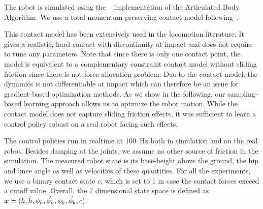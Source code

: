 The robot is simulated using the ~\cite{RBDL} implementation
of the Articulated Body Algorithm. We use a total momentum preserving contact model following~\cite[Section 3.4]{westervelt2007feedback}.



\begin{remark}
This contact model has been extensively used in the locomotion literature.
It gives a realistic, hard contact with discontinuity at impact and does not require to tune any parameters. Note that since there is only one contact point, the model is equivalent to a complementary constraint contact model without sliding friction since there is not force allocation problem. Due to the contact model, the dynamics is not
differentiable at impact which can therefore be an issue for gradient-based optimization methods. As we show in the following, our sampling-based learning approach allows us to optimize the robot motion. While the contact model does not capture sliding friction effects,
it was sufficient to learn a control policy robust on a real robot facing such effects.
\end{remark}

The control policies run in realtime at \SI{100}{\hertz} both in simulation and on the real robot. Besides damping at the joints, we assume no other source of friction in the simulation.
The measured robot state is its base-height above the ground, the hip and knee angle as well as velocities of these quantities.
For all the experiments, we use a binary contact state $c$, which is set to 1 in case the contact forces exceed a cutoff value.
Overall, the 7 dimensional state space is defined as ${\bm{x} = (h, \dot{h}, \phi_h, \dot{\phi_h}, \phi_k, \dot{\phi_k}, c)}$.
%

